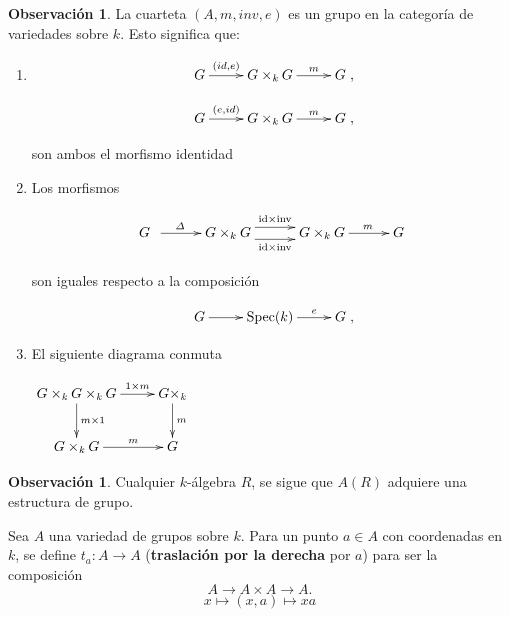 \documentclass[10pt]{amsart}
\theoremstyle{definition}
\newtheorem{obs}[definition]{Observaci\'on}
\theoremstyle{remark}
\theoremstyle{definition}
\begin{document}
\begin{obs} La cuarteta  $(A,m,inv,e)$ es un grupo en la categoría de variedades sobre $\mathit{k}$. Esto significa que:
\begin{enumerate}
\item 
\begin{equation*}
 \xymatrix{ G \ar[r]^-{(id,e)} & G \times_{\mathit{k}} G \ar[r]^-{m} & G},
\end{equation*}

\begin{equation*}
 \xymatrix{ G \ar[r]^-{(e,id)} & G \times_{\mathit{k}} G \ar[r]^-{m} & G},
\end{equation*}

son ambos el morfismo identidad

\item Los morfismos

$$\xymatrix@R=14mm@C=10mm{ G \,\,\, \ar@{->}[r]^(.4){\varDelta} & G \times_{k} G \ar@<1ex>[r]^{\text{id}\times \text{inv}} \ar@<-1ex>[r]_{\text{id}\times \text{inv}}& G \times_{k} G \ar@{->}[r]^(.6){m} &  G }$$


son iguales respecto a la composición

\begin{equation*}
 \xymatrix{ G \ar[r] & \operatorname{Spec}(k) \ar[r]^-{e} & G},
\end{equation*}

 \item  El siguiente diagrama conmuta

\begin{center}
		$\xymatrix{
		 G \times_{\mathit{k}} G \times_{\mathit{k}} G\ar[d]^-{m \times 1} \ar[r]^-{1 \times m}  & G \times_{\mathit{k}}\ar[d]^-{m} \\
		 G \times_{\mathit{k}} G\ar[r]^-{m}   & G}$ 
	\end{center} 
\end{enumerate}
\end{obs}

\begin{obs} Cualquier $\mathit{k}$-álgebra $R$, se sigue que $A(R)$ adquiere una estructura de grupo.
\end{obs}

Sea $A$ una variedad de grupos sobre $\mathit{k}$. Para un punto $a \in A$ con coordenadas en $\mathit{k}$, se define $t_{a}:A \rightarrow A$ (\textbf{traslación por la derecha} por $a$) para ser la composición
\begin{equation*}
A \rightarrow A \times A \rightarrow  A.
\end{equation*}
\begin{equation*}
x \mapsto (x,a) \mapsto xa
\end{equation*}
\end{document}
